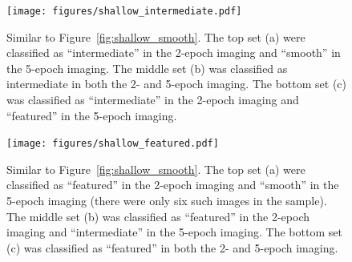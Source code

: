 \documentclass[a4paper,fleqn,usenatbib]{mnras}
\begin{document}
\begin{figure}
\centering
\texttt{[image: figures/shallow\_intermediate.pdf]}
\caption{Similar to Figure~\ref{fig:shallow_smooth}. The top set (a) were
classified as ``intermediate'' in the 2-epoch imaging and ``smooth'' in the
5-epoch imaging. The middle set (b) was classified as intermediate in both the
2- and 5-epoch imaging. The bottom set (c) was classified as ``intermediate''
in the 2-epoch imaging and ``featured'' in the 5-epoch imaging.}
\label{fig:shallow_intermediate}
\end{figure}

\begin{figure}
\centering
\texttt{[image: figures/shallow\_featured.pdf]}
\caption{Similar to Figure~\ref{fig:shallow_smooth}. The top set (a) were
classified as ``featured'' in the 2-epoch imaging and ``smooth'' in the 5-epoch
imaging (there were only six such images in the sample). The middle set (b) was
classified as ``featured'' in the 2-epoch imaging and ``intermediate'' in the
5-epoch imaging. The bottom set (c) was classified as ``featured'' in both the
2- and 5-epoch imaging.}
\label{fig:shallow_featured}
\end{figure}



\bsp	%
\label{lastpage}
\end{document}
